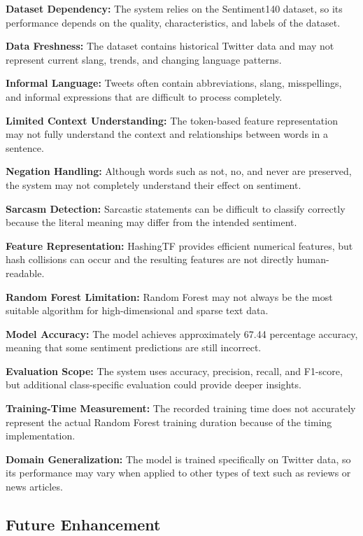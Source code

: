 \documentclass[12pt,a4paper]{article}
\begin{document}
\textbf{Dataset Dependency:} The system relies on the Sentiment140 dataset, so its performance depends on the quality, characteristics, and labels of the dataset.

\textbf{Data Freshness:} The dataset contains historical Twitter data and may not represent current slang, trends, and changing language patterns.

\textbf{Informal Language:} Tweets often contain abbreviations, slang, misspellings, and informal expressions that are difficult to process completely.

\textbf{Limited Context Understanding:} The token-based feature representation may not fully understand the context and relationships between words in a sentence.

\textbf{Negation Handling:} Although words such as not, no, and never are preserved, the system may not completely understand their effect on sentiment.

\textbf{Sarcasm Detection:} Sarcastic statements can be difficult to classify correctly because the literal meaning may differ from the intended sentiment.

\textbf{Feature Representation:} HashingTF provides efficient numerical features, but hash collisions can occur and the resulting features are not directly human-readable.

\textbf{Random Forest Limitation:} Random Forest may not always be the most suitable algorithm for high-dimensional and sparse text data.

\textbf{Model Accuracy:} The model achieves approximately 67.44 percentage accuracy, meaning that some sentiment predictions are still incorrect.

\textbf{Evaluation Scope:} The system uses accuracy, precision, recall, and F1-score, but additional class-specific evaluation could provide deeper insights.

\textbf{Training-Time Measurement:} The recorded training time does not accurately represent the actual Random Forest training duration because of the timing implementation.

\textbf{Domain Generalization:} The model is trained specifically on Twitter data, so its performance may vary when applied to other types of text such as reviews or news articles.

\subsection{Future Enhancement}
\end{document}
